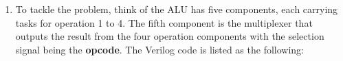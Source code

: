 \documentclass[11pt,letterpaper,titlepage]{article}
\begin{document}
\begin{enumerate}
    \newpage
    
    \item %
    
    To tackle the problem, think of the ALU has five components, each carrying tasks for operation 1 to 4. The fifth component is the multiplexer that outputs the result from the four operation components with the selection signal being the \textbf{opcode}. The Verilog code is listed as the following:
    
    
    
\end{enumerate}
\end{document}
